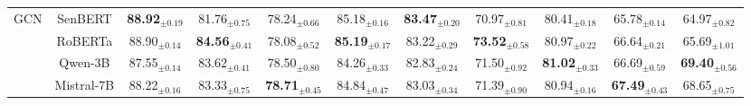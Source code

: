 \begin{table*}[!t]
{\begin{tabular}{cc|ccccccccc}
     \multirow{4}{*}{GCN} & SenBERT & \cellcolor{blue!10}\textbf{88.92$_{\pm \text{0.19}}$} & 81.76$_{\pm \text{0.75}}$ & 78.24$_{\pm \text{0.66}}$ & 85.18$_{\pm \text{0.16}}$ & \cellcolor{blue!10} \textbf{83.47$_{\pm \text{0.20}}$} & 70.97$_{\pm \text{0.81}}$ & 80.41$_{\pm \text{0.18}}$ & 65.78$_{\pm \text{0.14}}$ & 64.97$_{\pm \text{0.82}}$ \\ 
    &  RoBERTa & 88.90$_{\pm \text{0.14}}$ & \cellcolor{blue!10}\textbf{84.56$_{\pm \text{0.41}}$} & 78.08$_{\pm \text{0.52}}$ & \cellcolor{blue!10} \textbf{85.19$_{\pm \text{0.17}}$} & 83.22$_{\pm \text{0.29}}$ & \cellcolor{blue!10}\textbf{73.52$_{\pm \text{0.58}}$} & 80.97$_{\pm \text{0.22}}$ & 66.64$_{\pm \text{0.21}}$ & 65.69$_{\pm \text{1.01}}$ \\ 
    &  Qwen-3B & 87.55$_{\pm \text{0.14}}$ & 83.62$_{\pm \text{0.41}}$ & 78.50$_{\pm \text{0.80}}$ & 84.26$_{\pm \text{0.33}}$ & 82.83$_{\pm \text{0.24}}$ & 71.50$_{\pm \text{0.92}}$ & \cellcolor{blue!10} \textbf{81.02$_{\pm \text{0.33}}$} & 66.69$_{\pm \text{0.59}}$ & \cellcolor{blue!10} \textbf{69.40$_{\pm \text{0.56}}$} \\ 
    &  Mistral-7B & 88.22$_{\pm \text{0.16}}$ & 83.33$_{\pm \text{0.75}}$ & \cellcolor{blue!10} \textbf{78.71$_{\pm \text{0.45}}$} & 84.84$_{\pm \text{0.47}}$ & 83.03$_{\pm \text{0.34}}$ & 71.39$_{\pm \text{0.90}}$ & 80.94$_{\pm \text{0.16}}$ & \cellcolor{blue!10}\textbf{67.49$_{\pm \text{0.43}}$} & 68.65$_{\pm \text{0.75}}$ \\ \midrule


\end{tabular}}
\end{table*}
